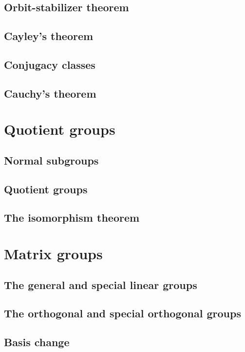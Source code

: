 \documentclass[main.tex]{subfiles}
\begin{document}
			\subsection{Orbit-stabilizer theorem}
			
			\subsection{Cayley's theorem}
			
			\subsection{Conjugacy classes}
			
			\subsection{Cauchy's theorem}
			
		\section{Quotient groups}
			\subsection{Normal subgroups}
			
			\subsection{Quotient groups}
			
			\subsection{The isomorphism theorem}
			
		\section{Matrix groups}
			\subsection{The general and special linear groups}
			
			\subsection{The orthogonal and special orthogonal groups}
			
			\subsection{Basis change}
			
\end{document}
